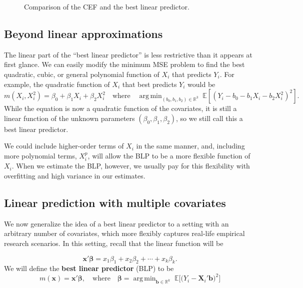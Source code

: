 \documentclass[
  13pt,
  letterpaper,
  DIV=11,
  numbers=noendperiod]{scrreprt}
\newcommand{\mb}{\symbf}
\newcommand{\E}{\mathbb{E}}
\newcommand{\real}{\mathbb{R}}
\newcommand{\bfx}{\mb{x}}
\newcommand{\bfbeta}{\mb{\beta}}
\DeclareMathOperator*{\argmin}{arg\,min}
\theoremstyle{plain}
\theoremstyle{definition}
\theoremstyle{definition}
\theoremstyle{remark}
\begin{document}
\begin{figure}[th]


\caption{\label{fig-cef-blp}Comparison of the CEF and the best linear
predictor.}

\end{figure}%

\subsection{Beyond linear
approximations}\label{beyond-linear-approximations}

The linear part of the ``best linear predictor'' is less restrictive
than it appears at first glance. We can easily modify the minimum MSE
problem to find the best quadratic, cubic, or general polynomial
function of \(X_i\) that predicts \(Y_i\). For example, the quadratic
function of \(X_i\) that best predicts \(Y_i\) would be \[ 
m(X_i, X_i^2) = \beta_0 + \beta_1X_i + \beta_2X_i^2 \quad\text{where}\quad \argmin_{(b_0,b_1,b_2) \in \mathbb{R}^3}\;\E[(Y_{i} - b_{0} - b_{1}X_{i} - b_{2}X_{i}^{2})^{2}].
\] While the equation is now a quadratic function of the covariates, it
is still a linear function of the unknown parameters
\((\beta_{0}, \beta_{1}, \beta_{2})\), so we still call this a best
linear predictor.

We could include higher-order terms of \(X_i\) in the same manner, and,
including more polynomial terms, \(X_i^p\), will allow the BLP to be a
more flexible function of \(X_i\). When we estimate the BLP, however, we
usually pay for this flexibility with overfitting and high variance in
our estimates.

\subsection{Linear prediction with multiple
covariates}\label{linear-prediction-with-multiple-covariates}

We now generalize the idea of a best linear predictor to a setting with
an arbitrary number of covariates, which more flexibly captures
real-life empirical research scenarios. In this setting, recall that the
linear function will be

\[ 
\bfx'\bfbeta = x_{1}\beta_{1} + x_{2}\beta_{2} + \cdots + x_{k}\beta_{k}.
\] We will define the \textbf{best linear predictor} (BLP) to be \[ 
m(\bfx) = \bfx'\bfbeta, \quad \text{where}\quad \bfbeta = \argmin_{\mb{b} \in \real^k}\; \E\bigl[ \bigl(Y_{i} - \mb{X}_{i}'\mb{b} \bigr)^2\bigr]
\]
\end{document}
